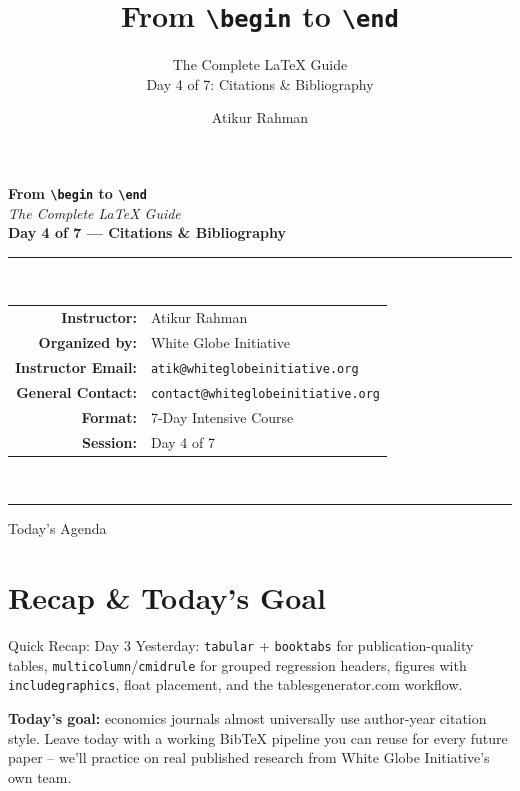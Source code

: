 \documentclass[11pt,aspectratio=169]{beamer}
\title[\texttt{\textbackslash begin} to \texttt{\textbackslash end}]{From \texttt{\textbackslash begin} to \texttt{\textbackslash end}}
\subtitle{The Complete LaTeX Guide \\[2pt] \normalsize Day 4 of 7: Citations \& Bibliography}
\author[A.\ Rahman]{Atikur Rahman}
\institute[White Globe Initiative]{White Globe Initiative}
\begin{document}
\begin{frame}[plain]
  \begin{center}
    \vspace{4pt}
    {\Huge\bfseries{}From \texttt{\textbackslash begin} to \texttt{\textbackslash end}}\\[6pt]
    {\Large\itshape The Complete LaTeX Guide}\\[18pt]
    {\large\bfseries Day 4 of 7 --- Citations \& Bibliography}\\[22pt]
    \rule{0.7\textwidth}{0.4pt}\\[14pt]
    \begin{tabular}{rl}
      \textbf{Instructor:}       & Atikur Rahman \\[3pt]
      \textbf{Organized by:}     & White Globe Initiative \\[3pt]
      \textbf{Instructor Email:} & \texttt{atik@whiteglobeinitiative.org} \\[3pt]
      \textbf{General Contact:}  & \texttt{contact@whiteglobeinitiative.org} \\[3pt]
      \textbf{Format:}           & 7-Day Intensive Course \\[3pt]
      \textbf{Session:}          & Day 4 of 7 \\
    \end{tabular}\\[18pt]
    \rule{0.7\textwidth}{0.4pt}
  \end{center}
\end{frame}

\begin{frame}{Today's Agenda}
  \tableofcontents
\end{frame}

\section{Recap \& Today's Goal}

\begin{frame}{Quick Recap: Day 3}
  \small
  Yesterday: \texttt{tabular} + \texttt{booktabs} for
  publication-quality tables, \texttt{multicolumn}/\texttt{cmidrule}
  for grouped regression headers, figures with
  \texttt{includegraphics}, float placement, and the
  tablesgenerator.com workflow.
  \vspace{6pt}

  \textbf{Today's goal:} economics journals almost universally use
  author-year citation style. Leave today with a working BibTeX
  pipeline you can reuse for every future paper -- we'll practice on
  real published research from White Globe Initiative's own team.
\end{frame}
\end{document}
